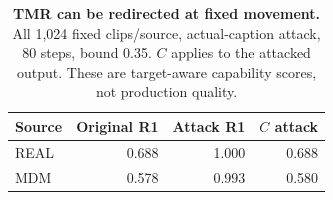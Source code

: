 \begin{table}[t]
\centering\footnotesize
\caption{\textbf{TMR can be redirected at fixed movement.} All 1,024 fixed clips/source, actual-caption attack, 80 steps, bound 0.35. $C$ applies to the attacked output. These are target-aware capability scores, not production quality.}\label{tab:tmrcapability}
\begin{tabular}{@{}lrrr@{}}\toprule
Source&Original R1&Attack R1&$C$ attack\\\midrule
REAL&0.688&1.000&0.688\\
MDM&0.578&0.993&0.580\\
\bottomrule\end{tabular}\end{table}
